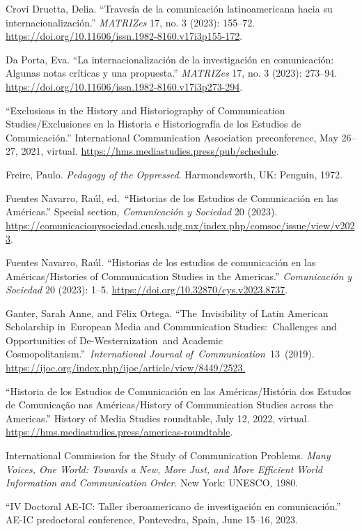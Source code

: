 \documentclass{tufte-handout}
\begin{document}
\begin{hangparas}{.25in}{1}
Crovi Druetta, Delia. ``Travesía de la comunicación latinoamericana
hacia su internacionalización.'' \emph{MATRIZes} 17, no. 3 (2023):
155--72. \url{https://doi.org/10.11606/issn.1982-8160.v17i3p155-172}.

Da Porta, Eva. ``La internacionalización de la investigación en
comunicación: Algunas notas críticas y una propuesta.'' \emph{MATRIZes}
17, no. 3 (2023): 273--94.
\url{https://doi.org/10.11606/issn.1982-8160.v17i3p273-294}.

``Exclusions in the History and Historiography of Communication
Studies/Exclusiones en la Historia e Historiografía de los Estudios de
Comunicación.'' International Communication Association preconference,
May 26--27, 2021, virtual.
\url{https://hms.mediastudies.press/pub/schedule}.

Freire, Paulo. \emph{Pedagogy of the Oppressed}. Harmondsworth, UK:
Penguin, 1972.

Fuentes Navarro, Raúl, ed.~``Historias de los Estudios de Comunicación
en las Américas.'' Special section, \emph{Comunicación y Sociedad} 20
(2023).
\url{https://comunicacionysociedad.cucsh.udg.mx/index.php/comsoc/issue/view/v2023}.

Fuentes Navarro, Raúl. ``Historias de los estudios de comunicación en
las Américas/Histories of Communication Studies in the Americas.''
\emph{Comunicación y Sociedad} 20 (2023): 1--5.
\url{https://doi.org/10.32870/cys.v2023.8737}.

Ganter, Sarah Anne, and Félix Ortega. ``The~Invisibility of Latin
American Scholarship in~European Media and Communication
Studies:~Challenges and Opportunities of De-Westernization~and Academic
Cosmopolitanism.''~\emph{International Journal
of~Communication}~13~(2019).
\url{https://ijoc.org/index.php/ijoc/article/view/8449/2523.}

``Historia de los Estudios de Comunicación en las Américas/História dos
Estudos de Comunicação nas Américas/History of Communication Studies
across the Americas.'' History of Media Studies roundtable, July 12,
2022, virtual. \url{https://hms.mediastudies.press/americas-roundtable}.

International Commission for the Study of Communication Problems.
\emph{Many Voices, One World: Towards a New, More Just, and More
Efficient World Information and Communication Order}. New York: UNESCO,
1980.

``IV Doctoral AE-IC: Taller iberoamericano de investigación en
comunicación.'' AE-IC predoctoral conference, Pontevedra, Spain, June
15--16, 2023.


\end{hangparas}
\end{document}
